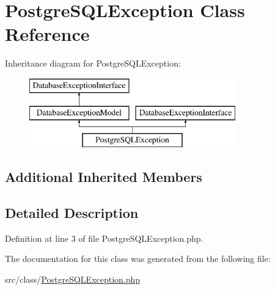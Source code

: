 \hypertarget{class_postgre_s_q_l_exception}{}\section{Postgre\+S\+Q\+L\+Exception Class Reference}
\label{class_postgre_s_q_l_exception}
Inheritance diagram for Postgre\+S\+Q\+L\+Exception\+:\begin{figure}[H]
\begin{center}
\leavevmode
\includegraphics[height=3.000000cm]{class_postgre_s_q_l_exception}
\end{center}
\end{figure}
\subsection*{Additional Inherited Members}


\subsection{Detailed Description}


Definition at line 3 of file Postgre\+S\+Q\+L\+Exception.\+php.



The documentation for this class was generated from the following file\+:\begin{DoxyCompactItemize}
\item 
src/class/\hyperlink{_postgre_s_q_l_exception_8php}{Postgre\+S\+Q\+L\+Exception.\+php}\end{DoxyCompactItemize}
